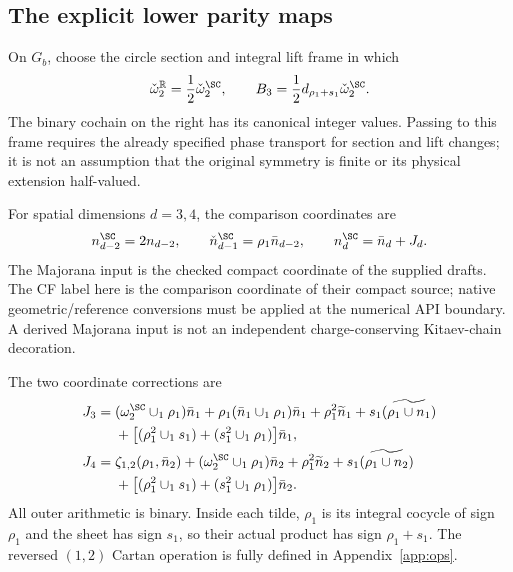 \subsection{The explicit lower parity maps}\label{subsec:parity-lower}
On $G_b$, choose the circle section and integral lift frame in which
\begin{equation}\label{eq:W-frame}
 \check\omega_2^{\mathbb R}=\frac12\check\omega_2^{\SC},\qquad
 B_3=\frac12d_{\rho_1+s_1}\check\omega_2^{\SC}.
\end{equation}
The binary cochain on the right has its canonical integer values. Passing to this frame requires the already specified phase transport for section and lift changes; it is not an assumption that the original symmetry is finite or its physical extension half-valued.

For spatial dimensions $d=3,4$, the comparison coordinates are
\begin{equation}\label{eq:lower-parity-map}
 n_{d-2}^{\SC}=2n_{d-2},\qquad
 \check n_{d-1}^{\SC}=\rho_1\bar n_{d-2},\qquad
 n_d^{\SC}=\bar n_d+J_d.
\end{equation}
The Majorana input is the checked compact coordinate of the supplied drafts. The CF label here is the comparison coordinate of their compact source; native geometric/reference conversions must be applied at the numerical API boundary. A derived Majorana input is not an independent charge-conserving Kitaev-chain decoration.

The two coordinate corrections are
\begin{align}
 J_3={}&(\omega_2^{\SC}\cup_1\rho_1)\bar n_1
 +\rho_1(\bar n_1\cup_1\rho_1)\bar n_1
 +\rho_1^2\widetilde n_1
 +s_1\widetilde{(\rho_1\cup n_1)}\nonumber\\
 &+\big[(\rho_1^2\cup_1s_1)+(s_1^2\cup_1\rho_1)\big]\bar n_1,
 \label{eq:J3-map}\\
 J_4={}&\zeta_{1,2}(\rho_1,\bar n_2)
 +(\omega_2^{\SC}\cup_1\rho_1)\bar n_2
 +\rho_1^2\widetilde n_2
 +s_1\widetilde{(\rho_1\cup n_2)}\nonumber\\
 &+\big[(\rho_1^2\cup_1s_1)+(s_1^2\cup_1\rho_1)\big]\bar n_2.
 \label{eq:J4}
\end{align}
All outer arithmetic is binary. Inside each tilde, $\rho_1$ is its integral cocycle of sign $\rho_1$ and the sheet has sign $s_1$, so their actual product has sign $\rho_1+s_1$. The reversed $(1,2)$ Cartan operation is fully defined in Appendix~\ref{app:ops}.

